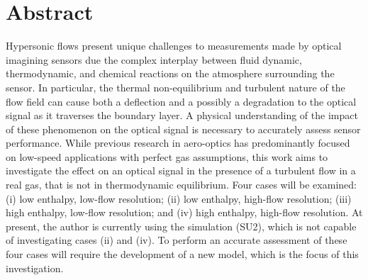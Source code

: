  \chapter*{Abstract}
Hypersonic flows present unique challenges to measurements made by optical imagining sensors due the complex interplay between fluid dynamic, thermodynamic, and chemical reactions on the atmosphere surrounding the sensor. In particular, the thermal non-equilibrium and turbulent nature of the flow field can cause both a deflection and a possibly a degradation to the optical signal as it traverses the boundary layer. A physical understanding of the impact of these phenomenon on the optical signal is necessary to accurately assess sensor performance. While previous research in aero-optics has predominantly focused on low-speed applications with perfect gas assumptions, this work aims to investigate the effect on an optical signal in the presence of a turbulent flow in a real gas, that is not in thermodynamic equilibrium. Four cases will be examined: (i) low enthalpy, low-flow resolution; (ii) low enthalpy, high-flow resolution; (iii) high enthalpy, low-flow resolution; and (iv) high enthalpy, high-flow resolution. At present, the author is currently using the simulation (SU2), which is not capable of investigating cases (ii) and (iv). To perform an accurate assessment of these four cases will require the development of a new model, which is the focus of this investigation.

\newpage
